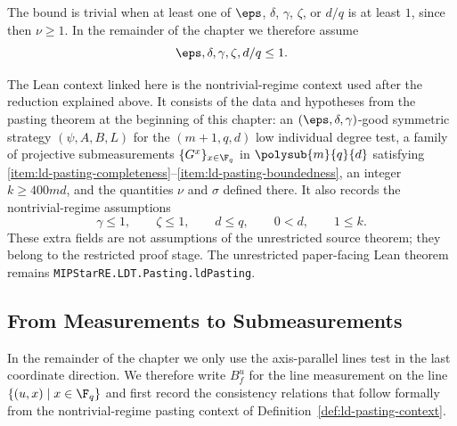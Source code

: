The bound is trivial when at least one of $\eps$, $\delta$, $\gamma$, $\zeta$, or $d/q$ is at least $1$, since then $\nu \ge 1$. In the remainder of the chapter we therefore assume
\[
	\eps,\delta,\gamma,\zeta,d/q \le 1.
\]

\begin{definition}\label{def:ld-pasting-context}
	\leanok
	The Lean context linked here is the nontrivial-regime context used after the
	reduction explained above.  It consists of the data and hypotheses from the
	pasting theorem at the beginning of this chapter: an $(\eps,\delta,\gamma)$-good symmetric strategy
	$(\psi,A,B,L)$ for the $(m+1,q,d)$ low individual degree test, a family of
	projective submeasurements $\{G^x\}_{x \in \F_q}$ in $\polysub{m}{q}{d}$
	satisfying \ref{item:ld-pasting-completeness}--\ref{item:ld-pasting-boundedness},
	an integer $k \ge 400md$, and the quantities $\nu$ and $\sigma$ defined there.
	It also records the nontrivial-regime assumptions
	\[
		\gamma \le 1,\qquad \zeta \le 1,\qquad d \le q,\qquad 0<d,\qquad 1\le k.
	\]
	These extra fields are not assumptions of the unrestricted source theorem;
	they belong to the restricted proof stage.  The unrestricted paper-facing Lean
	theorem remains \texttt{MIPStarRE.LDT.Pasting.ldPasting}.
\end{definition}

\subsection{From Measurements to Submeasurements}

In the remainder of the chapter we only use the axis-parallel lines test in the
last coordinate direction. We therefore write $B_f^u$ for the line measurement
on the line $\{(u,x)\mid x\in\F_q\}$ and first record the consistency relations
that follow formally from the nontrivial-regime pasting context of
Definition~\ref{def:ld-pasting-context}.

